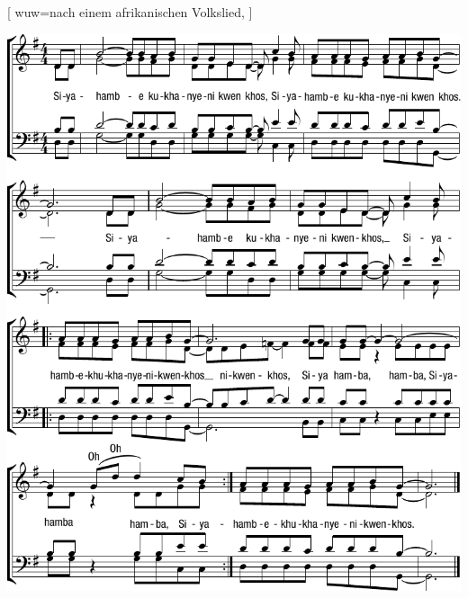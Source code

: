 [
    wuw={nach einem afrikanischen Volkslied},
]

\centering\includegraphics[width=1\textwidth]{Noten/Lied118.pdf}

\endsong